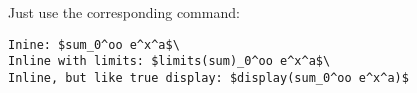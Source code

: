Just use the corresponding command:

\begin{verbatim}
Inine: $sum_0^oo e^x^a$\
Inline with limits: $limits(sum)_0^oo e^x^a$\
Inline, but like true display: $display(sum_0^oo e^x^a)$
\end{verbatim}

\pandocbounded{}
